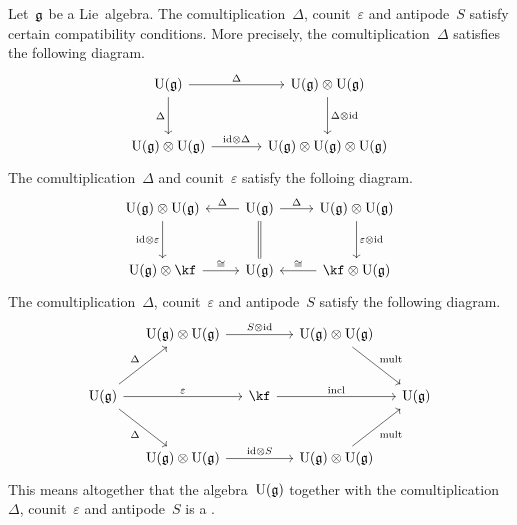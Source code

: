 \begin{remark}
  Let~$\mathfrak{g}$ be a Lie~algebra.
  The comultiplication~$\Delta$, counit~$\varepsilon$ and antipode~$S$ satisfy certain compatibility conditions.
  More precisely, the comultiplication~$\Delta$ satisfies the following  diagram.
  \[
    \begin{tikzcd}[sep = large]
      \Univ(\glie)
      \arrow{r}[above]{\Delta}
      \arrow{d}[left]{\Delta}
      &
      \Univ(\glie) \otimes \Univ(\glie)
      \arrow{d}[right]{\Delta \otimes \id}
      \\
      \Univ(\glie) \otimes \Univ(\glie)
      \arrow{r}[above]{\id \otimes \Delta}
      &
      \Univ(\glie) \otimes \Univ(\glie) \otimes \Univ(\glie)
    \end{tikzcd}
  \]
  The comultiplication~$\Delta$ and counit~$\varepsilon$ satisfy the folloing  diagram.
  \[
    \begin{tikzcd}[row sep = large]
      \Univ(\glie) \otimes \Univ(\glie)
      \arrow{d}[left]{\id \otimes \varepsilon}
      &
      \Univ(\glie)
      \arrow{l}[above]{\Delta}
      \arrow{r}[above]{\Delta}
      \arrow[equal]{d}
      &
      \Univ(\glie) \otimes \Univ(\glie)
      \arrow{d}[right]{\varepsilon \otimes \id}
      \\
      \Univ(\glie) \otimes \kf
      \arrow{r}[above]{\cong}
      &
      \Univ(\glie)
      &
      \kf \otimes \Univ(\glie)
      \arrow{l}[above]{\cong}
    \end{tikzcd}
  \]
  The comultiplication~$\Delta$, counit~$\varepsilon$ and antipode~$S$ satisfy the following  diagram.
  \[
    \begin{tikzcd}[column sep = small, row sep = large]
      {}
      &
      \Univ(\glie) \otimes \Univ(\glie)
      \arrow{rr}{S \otimes \id}
      &
      {}
      &
      \Univ(\glie) \otimes \Univ(\glie)
      \arrow{dr}{\mathrm{mult}}
      &
      {}
      \\
      \Univ(\glie)
      \arrow{ur}[above left]{\Delta}
      \arrow{rr}[above]{\varepsilon}
      \arrow{dr}[below left]{\Delta}
      &
      {}
      &
      \kf
      \arrow{rr}[above]{\mathrm{incl}}
      &
      {}
      &
      \Univ(\glie)
      \\
      {}
      &
      \Univ(\glie) \otimes \Univ(\glie)
      \arrow{rr}[above]{\id \otimes S}
      &
      {}
      &
      \Univ(\glie) \otimes \Univ(\glie)
      \arrow{ur}[below right]{\mathrm{mult}}
      &
      {}
    \end{tikzcd}
  \]
  This means altogether that the algebra~$\operatorname{U}(\mathfrak{g})$ together with the comultiplication~$\Delta$, counit~$\varepsilon$ and antipode~$S$ is a .
\end{remark}




